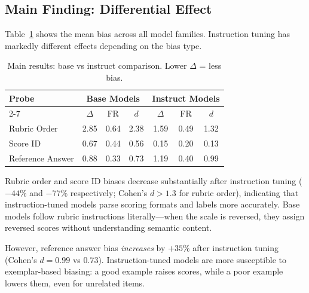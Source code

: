 \documentclass[11pt,twocolumn]{article}
\begin{document}

\subsection{Main Finding: Differential Effect}
Table~\ref{tab:main} shows the mean bias across all model families. Instruction tuning has markedly different effects depending on the bias type.

\begin{table}[h]
\centering\small
\caption{Main results: base vs instruct comparison. Lower $\Delta$ = less bias.}
\label{tab:main}
\begin{tabular}{|l|c|c|c|c|c|c|}
\hline
\multirow{2}{*}{\textbf{Probe}} & \multicolumn{3}{c|}{\textbf{Base Models}} & \multicolumn{3}{c|}{\textbf{Instruct Models}} \\
\cline{2-7}
 & $\Delta$ & FR & $d$ & $\Delta$ & FR & $d$ \\
\hline
Rubric Order & 2.85 & 0.64 & 2.38 & 1.59 & 0.49 & 1.32 \\
Score ID & 0.67 & 0.44 & 0.56 & 0.15 & 0.20 & 0.13 \\
Reference Answer & 0.88 & 0.33 & 0.73 & 1.19 & 0.40 & 0.99 \\
\hline
\end{tabular}
\end{table}

Rubric order and score ID biases decrease substantially after instruction tuning ($-44\%$ and $-77\%$ respectively; Cohen's $d > 1.3$ for rubric order), indicating that instruction-tuned models parse scoring formats and labels more accurately. Base models follow rubric instructions literally---when the scale is reversed, they assign reversed scores without understanding semantic content.

However, reference answer bias \emph{increases} by $+35\%$ after instruction tuning (Cohen's $d = 0.99$ vs $0.73$). Instruction-tuned models are more susceptible to exemplar-based biasing: a good example raises scores, while a poor example lowers them, even for unrelated items.
\end{document}
